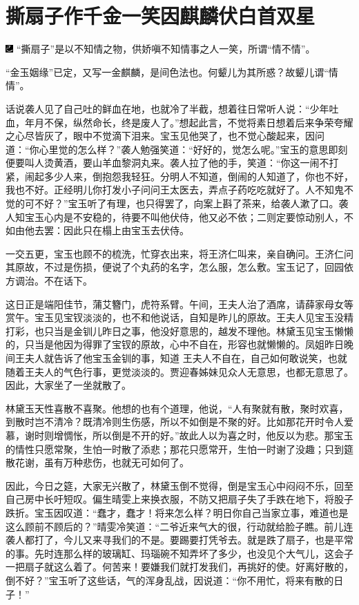

\chapter{撕扇子作千金一笑\hspace{.5em}因麒麟伏白首双星}

{\includegraphics[width=3mm]{../Images/00003}  \kaishu “撕扇子”是以不知情之物，供娇嗔不知情事之人一笑，所谓“情不情”。}

{ \kaishu “金玉姻缘”已定，又写一金麒麟，是间色法也。何颦儿为其所惑？故颦儿谓“情情”。}

话说袭人见了自己吐的鲜血在地，也就冷了半截，想着往日常听人说：“少年吐血，年月不保，纵然命长，终是废人了。”想起此言，不觉将素日想着后来争荣夸耀之心尽皆灰了，眼中不觉滴下泪来。宝玉见他哭了，也不觉心酸起来，因问道：“你心里觉的怎么样？”袭人勉强笑道：“好好的，觉怎么呢。”宝玉的意思即刻便要叫人烫黄酒，要山羊血黎洞丸来。袭人拉了他的手，笑道：“你这一闹不打紧，闹起多少人来，倒抱怨我轻狂。分明人不知道，倒闹的人知道了，你也不好，我也不好。正经明儿你打发小子问问王太医去，弄点子药吃吃就好了。人不知鬼不觉的可不好？”宝玉听了有理，也只得罢了，向案上斟了茶来，给袭人漱了口。袭人知宝玉心内是不安稳的，待要不叫他伏侍，他又必不依；二则定要惊动别人，不如由他去罢：因此只在榻上由宝玉去伏侍。

一交五更，宝玉也顾不的梳洗，忙穿衣出来，将王济仁叫来，亲自确问。王济仁问其原故，不过是伤损，便说了个丸药的名字，怎么服，怎么敷。宝玉记了，回园依方调治。不在话下。

这日正是端阳佳节，蒲艾簪门，虎符系臂。午间，王夫人治了酒席，请薛家母女等赏午。宝玉见宝钗淡淡的，也不和他说话，自知是昨儿的原故。王夫人见宝玉没精打彩，也只当是金钏儿昨日之事，他没好意思的，越发不理他。林黛玉见宝玉懒懒的，只当是他因为得罪了宝钗的原故，心中不自在，形容也就懒懒的。凤姐昨日晚间王夫人就告诉了他宝玉金钏的事，知道
王夫人不自在，自己如何敢说笑，也就随着王夫人的气色行事，更觉淡淡的。贾迎春姊妹见众人无意思，也都无意思了。因此，大家坐了一坐就散了。

林黛玉天性喜散不喜聚。他想的也有个道理，他说，“人有聚就有散，聚时欢喜，到散时岂不清冷？既清冷则生伤感，所以不如倒是不聚的好。比如那花开时令人爱慕，谢时则增惆怅，所以倒是不开的好。”故此人以为喜之时，他反以为悲。那宝玉的情性只愿常聚，生怕一时散了添悲；那花只愿常开，生怕一时谢了没趣；只到筵散花谢，虽有万种悲伤，也就无可如何了。

因此，今日之筵，大家无兴散了，林黛玉倒不觉得，倒是宝玉心中闷闷不乐，回至自己房中长吁短叹。偏生晴雯上来换衣服，不防又把扇子失了手跌在地下，将股子跌折。宝玉因叹道：“蠢才，蠢才！将来怎么样？明日你自己当家立事，难道也是这么顾前不顾后的？”晴雯冷笑道：“二爷近来气大的很，行动就给脸子瞧。前儿连袭人都打了，今儿又来寻我们的不是。要踢要打凭爷去。就是跌了扇子，也是平常的事。先时连那么样的玻璃缸、玛瑙碗不知弄坏了多少，也没见个大气儿，这会子一把扇子就这么着了。何苦来！要嫌我们就打发我们，再挑好的使。好离好散的，倒不好？”宝玉听了这些话，气的浑身乱战，因说道：“你不用忙，将来有散的日子！”

